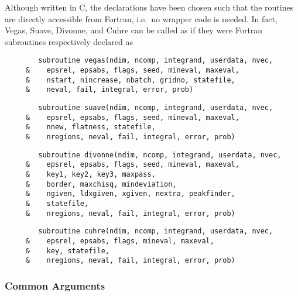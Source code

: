 \documentclass[12pt]{article}
\newcommand\ie{i.e.\ }
\begin{document}
Although written in C, the declarations have been chosen such that the
routines are directly accessible from Fortran, \ie no wrapper code is
needed.  In fact, Vegas, Suave, Divonne, and Cuhre can be called as if 
they were Fortran subroutines respectively declared as
\begin{verbatim}
        subroutine vegas(ndim, ncomp, integrand, userdata, nvec,
     &    epsrel, epsabs, flags, seed, mineval, maxeval,
     &    nstart, nincrease, nbatch, gridno, statefile,
     &    neval, fail, integral, error, prob)
\end{verbatim}
\begin{verbatim}
        subroutine suave(ndim, ncomp, integrand, userdata, nvec,
     &    epsrel, epsabs, flags, seed, mineval, maxeval,
     &    nnew, flatness, statefile,
     &    nregions, neval, fail, integral, error, prob)
\end{verbatim}
\begin{verbatim}
        subroutine divonne(ndim, ncomp, integrand, userdata, nvec,
     &    epsrel, epsabs, flags, seed, mineval, maxeval,
     &    key1, key2, key3, maxpass,
     &    border, maxchisq, mindeviation,
     &    ngiven, ldxgiven, xgiven, nextra, peakfinder,
     &    statefile,
     &    nregions, neval, fail, integral, error, prob)
\end{verbatim}
\begin{verbatim}
        subroutine cuhre(ndim, ncomp, integrand, userdata, nvec,
     &    epsrel, epsabs, flags, mineval, maxeval,
     &    key, statefile,
     &    nregions, neval, fail, integral, error, prob)
\end{verbatim}


\subsubsection{Common Arguments}
\label{sect:commonargs}
\end{document}
